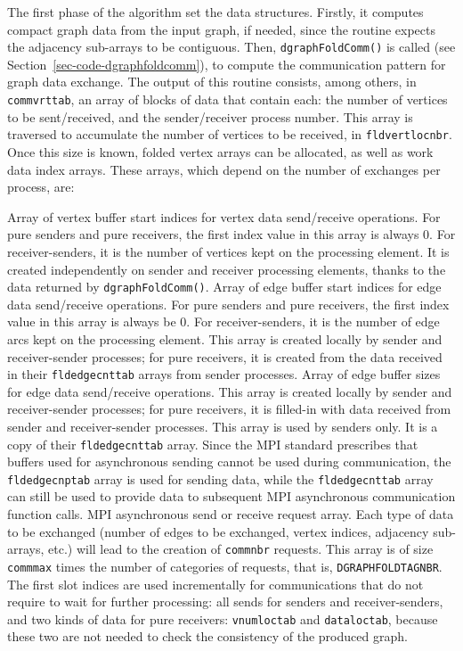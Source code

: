 The first phase of the algorithm set the data structures. Firstly, it
computes compact graph data from the input graph, if needed, since the
routine expects the adjacency sub-arrays to be contiguous. Then,
\texttt{dgraph\lbt Fold\lbt Comm()} is called (see
Section~\ref{sec-code-dgraphfoldcomm}), to compute the communication
pattern for graph data exchange. The output of this routine consists,
among others, in \texttt{comm\lbt vrt\lbt tab}, an array of blocks of
data that contain each: the number of vertices to be sent/received,
and the sender/receiver process number. This array is traversed to
accumulate the number of vertices to be received, in
\texttt{fld\lbt vert\lbt locnbr}. Once this size is known, folded
vertex arrays can be allocated, as well as work data index
arrays. These arrays, which depend on the number of exchanges per
process, are:
\begin{itemize}
  Array of vertex buffer start indices for vertex data send/receive
  operations. For pure senders and pure receivers, the first index
  value in this array is always $0$. For receiver-senders, it is the
  number of vertices kept on the processing element. It is created
  independently on sender and receiver processing elements, thanks to
  the data returned by \texttt{dgraph\lbt Fold\lbt Comm()}.
  Array of edge buffer start indices for edge data send/receive
  operations. For pure senders and pure receivers, the first index
  value in this array is always be $0$. For receiver-senders, it is
  the number of edge arcs kept on the processing element. This array
  is created locally by sender and receiver-sender processes; for pure
  receivers, it is created from the data received in their
  \texttt{fld\lbt edge\lbt cnttab} arrays from sender processes.
  Array of edge buffer sizes for edge data send/receive operations.
  This array is created locally by sender and receiver-sender
  processes; for pure receivers, it is filled-in with data received
  from sender and receiver-sender processes.
  This array is used by senders only. It is a copy of their
  \texttt{fld\lbt edge\lbt cnttab} array. Since the MPI standard
  prescribes that buffers used for asynchronous sending cannot be used
  during communication, the \texttt{fld\lbt edge\lbt cnptab} array is
  used for sending data, while the \texttt{fld\lbt edge\lbt cnttab}
  array can still be used to provide data to subsequent MPI
  asynchronous communication function calls.
  MPI asynchronous send or receive request array. Each type of data
  to be exchanged (number of edges to be exchanged, vertex indices,
  adjacency sub-arrays, etc.) will lead to the creation of
  \texttt{commnbr} requests. This array is of size \texttt{commmax}
  times the number of categories of requests, that is,
  \texttt{DGRAPH\lbt FOLD\lbt TAGNBR}.
  The first slot indices are used incrementally for communications
  that do not require to wait for further processing: all sends for
  senders and receiver-senders, and two kinds of data for pure
  receivers: \texttt{vnum\lbt loctab} and \texttt{data\lbt loctab},
  because these two are not needed to check the consistency of the
  produced graph.
\end{itemize}
